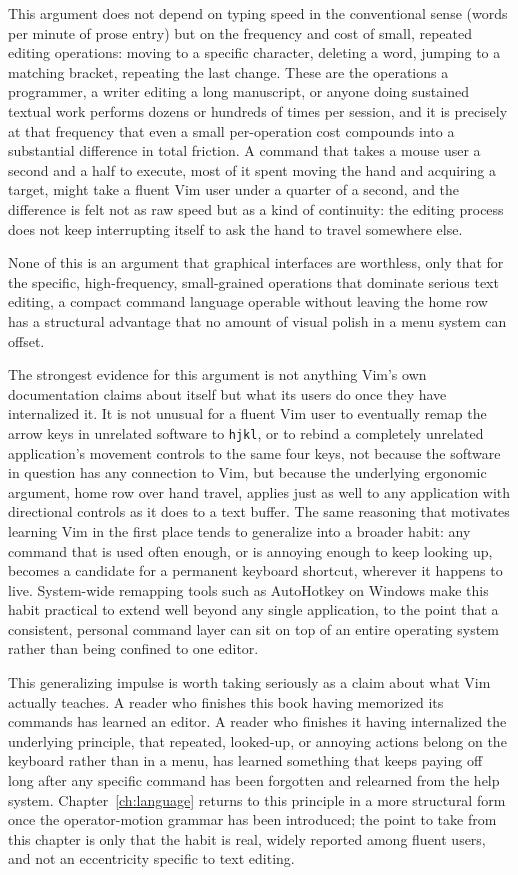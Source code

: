 This argument does not depend on typing speed in the conventional sense (words per minute of prose entry) but on the frequency and cost of small, repeated editing operations: moving to a specific character, deleting a word, jumping to a matching bracket, repeating the last change. These are the operations a programmer, a writer editing a long manuscript, or anyone doing sustained textual work performs dozens or hundreds of times per session, and it is precisely at that frequency that even a small per-operation cost compounds into a substantial difference in total friction. A command that takes a mouse user a second and a half to execute, most of it spent moving the hand and acquiring a target, might take a fluent Vim user under a quarter of a second, and the difference is felt not as raw speed but as a kind of continuity: the editing process does not keep interrupting itself to ask the hand to travel somewhere else.

None of this is an argument that graphical interfaces are worthless, only that for the specific, high-frequency, small-grained operations that dominate serious text editing, a compact command language operable without leaving the home row has a structural advantage that no amount of visual polish in a menu system can offset.

The strongest evidence for this argument is not anything Vim's own documentation claims about itself but what its users do once they have internalized it. It is not unusual for a fluent Vim user to eventually remap the arrow keys in unrelated software to \texttt{hjkl}, or to rebind a completely unrelated application's movement controls to the same four keys, not because the software in question has any connection to Vim, but because the underlying ergonomic argument, home row over hand travel, applies just as well to any application with directional controls as it does to a text buffer. The same reasoning that motivates learning Vim in the first place tends to generalize into a broader habit: any command that is used often enough, or is annoying enough to keep looking up, becomes a candidate for a permanent keyboard shortcut, wherever it happens to live. System-wide remapping tools such as AutoHotkey on Windows make this habit practical to extend well beyond any single application, to the point that a consistent, personal command layer can sit on top of an entire operating system rather than being confined to one editor.

This generalizing impulse is worth taking seriously as a claim about what Vim actually teaches. A reader who finishes this book having memorized its commands has learned an editor. A reader who finishes it having internalized the underlying principle, that repeated, looked-up, or annoying actions belong on the keyboard rather than in a menu, has learned something that keeps paying off long after any specific command has been forgotten and relearned from the help system. Chapter~\ref{ch:language} returns to this principle in a more structural form once the operator-motion grammar has been introduced; the point to take from this chapter is only that the habit is real, widely reported among fluent users, and not an eccentricity specific to text editing.

